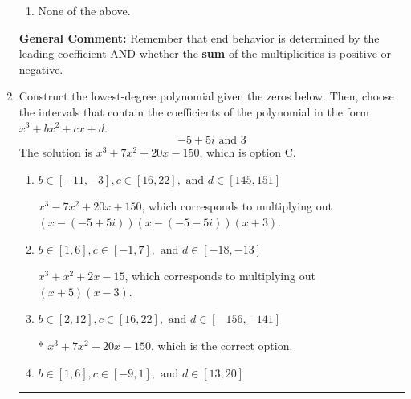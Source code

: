 \documentclass{extbook}[14pt]
\newcommand{\litem}[1]{\item #1

\rule{\textwidth}{0.4pt}}
\begin{document}
\begin{enumerate}
{\begin{enumerate}[label=\Alph*.]
\item None of the above.\end{enumerate}
\textbf{General Comment:} Remember that end behavior is determined by the leading coefficient AND whether the \textbf{sum} of the multiplicities is positive or negative.
}
\litem{
Construct the lowest-degree polynomial given the zeros below. Then, choose the intervals that contain the coefficients of the polynomial in the form $x^3+bx^2+cx+d$.
\[ -5 + 5 i \text{ and } 3 \]The solution is \( x^{3} +7 x^{2} +20 x -150 \), which is option C.\begin{enumerate}[label=\Alph*.]
\item \( b \in [-11, -3], c \in [16, 22], \text{ and } d \in [145, 151] \)

$x^{3} -7 x^{2} +20 x + 150$, which corresponds to multiplying out $(x-(-5 + 5 i))(x-(-5 - 5 i))(x + 3)$.
\item \( b \in [1, 6], c \in [-1, 7], \text{ and } d \in [-18, -13] \)

$x^{3} + x^{2} +2 x -15$, which corresponds to multiplying out $(x + 5)(x -3)$.
\item \( b \in [2, 12], c \in [16, 22], \text{ and } d \in [-156, -141] \)

* $x^{3} +7 x^{2} +20 x -150$, which is the correct option.
\item \( b \in [1, 6], c \in [-9, 1], \text{ and } d \in [13, 20] \)


\end{enumerate}}
\end{enumerate}
\end{document}
